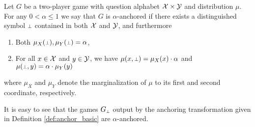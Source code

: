 \begin{definition} \label{def:anchored_two}
Let $G$ be a two-player game with question alphabet $\mathcal{X}\times\mathcal{Y}$ and distribution $\mu$. For any $0<\alpha\leq 1$ we say that $G$ is $\alpha$-anchored if there exists a distinguished symbol $\dummy$ contained in both $\mathcal{X}$ and $\mathcal{Y}$, and furthermore %
\begin{enumerate}
\item Both $\mu_X(\dummy), \mu_Y(\dummy) = \alpha$,
\item For all $x \in \mathcal{X}$ and $y \in \mathcal{Y}$, we have $\mu(x,\dummy) = \mu_X(x) \cdot \alpha$ and $\mu(\dummy,y) = \alpha \cdot \mu_Y(y)$
\end{enumerate}
where $\mu_X$ and $\mu_Y$ denote the marginalization of $\mu$ to its first and second coordinate, respectively.
\end{definition}


It is easy to see that the games $G_\dummy$ output by the anchoring transformation given in Definition \ref{def:anchor_basic} are $\alpha$-anchored. 
%
